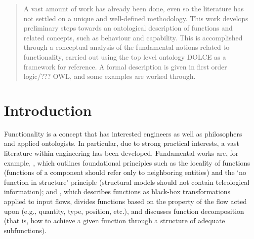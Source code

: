 \documentclass[crcready]{iosart2x}
\newcommand{\DOLCE}{\textsc{DOLCE}\xspace} %
\newcommand{\OWL}{\textnormal{OWL}\xspace}
\newcommand{\TODO}[1]{{\color{red} #1}}
\begin{document}
\begin{frontmatter}
\begin{abstract}
    A vast amount of work has already been done, even so the literature has not settled on a unique and well-defined methodology. 
    This work develops preliminary steps towards an ontological description of functions and related concepts, such as behaviour and capability.
    This is accomplished through a conceptual analysis of the fundamental notions related to functionality, carried out using the top level ontology \DOLCE as a framework for reference. 
    A formal description is given in \TODO{first order logic/???} \OWL, and some examples are worked through.
    
\end{abstract}

\begin{keyword} 
\end{keyword}

\end{frontmatter}




\section{Introduction}\label{sec:intro}
Functionality is a concept that has interested engineers as well as philosophers and applied ontologists.
In particular, due to strong practical interests, a vast literature within engineering has been developed. Fundamental works are, for example, 
 \cite{de_kleer_how_1984, kleer_qualitative_1984}, which outlines foundational principles such as the locality of functions (functions of a component should refer only to neighboring entities)
 and the `no function in structure' principle (structural models should not contain teleological information); and \cite{pahl_engineering_2007}, which describes functions as black-box transformations applied to input flows, divides functions based on the property of the flow 
 acted upon (e.g., quantity, type, position, etc.), and discusses function decomposition (that is, how to achieve a given function through a structure of adequate subfunctions).
\end{document}
